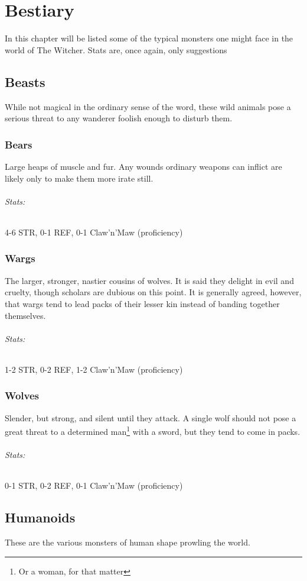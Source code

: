 \documentclass[parskip=full,11pt]{scrreport}
\begin{document}
\normalsize

\chapter{Bestiary}
In this chapter will be listed some of the typical monsters one might face in the world of The Witcher.
Stats are, once again, only suggestions

\section{Beasts}
While not magical in the ordinary sense of the word, these wild animals pose a serious threat to any wanderer
foolish enough to disturb them.

\subsection{Bears}
Large heaps of muscle and fur. Any wounds ordinary weapons can inflict are likely only to make them more irate still.

\subparagraph{Stats:}
4-6 STR, 0-1 REF, 0-1 Claw'n'Maw (proficiency)

\subsection{Wargs}
The larger, stronger, nastier cousins of wolves. It is said they delight in evil and cruelty, though scholars
are dubious on this point. It is generally agreed, however, that wargs tend to lead packs of their lesser kin
instead of banding together themselves.

\subparagraph{Stats:}
1-2 STR, 0-2 REF, 1-2 Claw'n'Maw (proficiency)

\subsection{Wolves}
Slender, but strong, and silent until they attack. A single wolf should not pose a great threat to a determined
man\footnote{Or a woman, for that matter} with a sword, but they tend to come in packs.

\subparagraph{Stats:}
0-1 STR, 0-2 REF, 0-1 Claw'n'Maw (proficiency)

\section{Humanoids}
These are the various monsters of human shape prowling the world.
\end{document}
